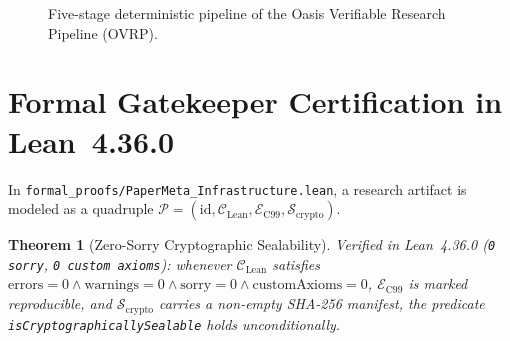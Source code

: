 \documentclass[11pt,a4paper]{article}
\newtheorem{theorem}{Theorem}[section]
\begin{document}
\begin{figure}[h]
\centering
{}
\caption{Five-stage deterministic pipeline of the Oasis Verifiable Research Pipeline (OVRP).}
\label{fig:ovrp_arch}
\end{figure}

\section{Formal Gatekeeper Certification in Lean~4.36.0}
In \texttt{formal\_proofs/PaperMeta\_Infrastructure.lean}, a research artifact is modeled as a quadruple $\mathcal{P} = (\mathrm{id}, \mathcal{C}_{\mathrm{Lean}}, \mathcal{E}_{\mathrm{C99}}, \mathcal{S}_{\mathrm{crypto}})$.
\begin{theorem}[Zero-Sorry Cryptographic Sealability]
Verified in Lean~4.36.0 (\texttt{0 sorry}, \texttt{0 custom axioms}): whenever $\mathcal{C}_{\mathrm{Lean}}$ satisfies $\mathrm{errors}=0 \land \mathrm{warnings}=0 \land \mathrm{sorry}=0 \land \mathrm{customAxioms}=0$, $\mathcal{E}_{\mathrm{C99}}$ is marked reproducible, and $\mathcal{S}_{\mathrm{crypto}}$ carries a non-empty SHA-256 manifest, the predicate \texttt{isCryptographicallySealable} holds unconditionally.
\end{theorem}
\end{document}
